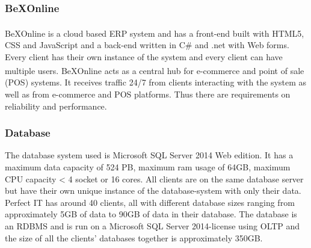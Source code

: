 \documentclass{cslthse-msc}
\newcommand{\bex}{BeX\textsuperscript{\textregistered}}
\begin{document}
\subsubsection{\bex Online}
\bex Online is a cloud based ERP system and has a front-end built with HTML5, CSS and JavaScript and a back-end written in C\# and .net with Web forms.
Every client has their own instance of the system and every client can have multiple users. \bex Online acts as a central hub for e-commerce and point of sale (POS) systems. It receives traffic 24/7 from clients interacting with the system as well as from e-commerce and POS platforms. Thus there are requirements on reliability and performance.

\subsubsection{Database}
The database system used is Microsoft SQL Server 2014 Web edition. It has a maximum data capacity of 524 PB, maximum ram usage of 64GB, maximum CPU capacity < 4 socket or 16 cores. All clients are on the same database server but have their own unique instance of the database-system with only their data.  Perfect IT has around 40 clients, all with different database sizes ranging from approximately 5GB of data to 90GB of data in their database. The database is an RDBMS and is run on a Microsoft SQL Server 2014-license using OLTP and the size of all the clients' databases together is approximately 350GB.
\end{document}
